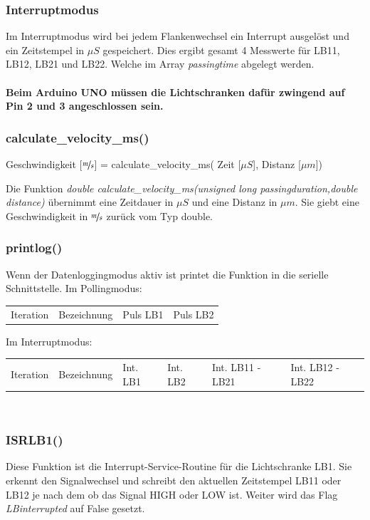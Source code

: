 \subsubsection{Interruptmodus}
Im Interruptmodus wird bei jedem Flankenwechsel ein Interrupt ausgelöst und ein Zeitstempel in $\mu S$ gespeichert. Dies ergibt gesamt 4 Messwerte für LB11, LB12, LB21 und LB22. Welche im Array \textit{passingtime} abgelegt werden.\\
\\
\textbf{Beim Arduino UNO müssen die Lichtschranken dafür zwingend auf Pin 2 und 3 angeschlossen sein.}


\subsubsection{calculate\_velocity\_ms()}
\begin{center}
   Geschwindigkeit [$\nicefrac{m}{s}$] = calculate\_velocity\_ms( Zeit [$\mu S$], Distanz [$\mu m$])
\end{center}

Die Funktion \textit{double calculate\_velocity\_ms(unsigned long passingduration,double distance)} übernimmt eine Zeitdauer in $\mu S$ und eine Distanz in $\mu m$.
Sie giebt eine Geschwindigkeit in $\nicefrac{m}{s}$ zurück vom Typ double.

\clearpage
\subsubsection{printlog()}
Wenn der Datenloggingmodus aktiv ist printet die Funktion in die serielle Schnittstelle.
Im Pollingmodus:\\
\begin{tabular}{llll}
    Iteration&Bezeichnung& Puls LB1 & Puls LB2\\
\end{tabular}

Im Interruptmodus:\\
\begin{tabular}{llllll}
    Iteration&Bezeichnung& Int. LB1 & Int. LB2& Int. LB11 - LB21& Int. LB12 - LB22\\
\end{tabular}\\

\subsubsection{ISRLB1()}
Diese Funktion ist die Interrupt-Service-Routine für die Lichtschranke LB1. Sie erkennt den Signalwechsel und schreibt den aktuellen Zeitstempel LB11 oder LB12 je nach dem ob das Signal HIGH oder LOW ist. Weiter wird das Flag \textit{LBinterrupted} auf False gesetzt.\\


